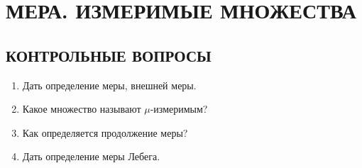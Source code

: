 \documentclass[12pt,a4paper]{article}
\begin{document}
\section{МЕРА. ИЗМЕРИМЫЕ МНОЖЕСТВА}

\subsection*{КОНТРОЛЬНЫЕ ВОПРОСЫ}
\begin{enumerate}
\item Дать определение меры, внешней меры.
\item Какое множество называют $\mu$-измеримым?
\item Как определяется продолжение меры?
\item Дать определение меры Лебега.
\end{enumerate}
\end{document}
